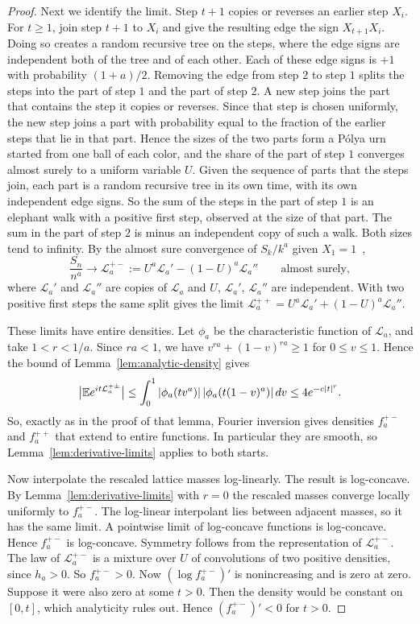 \begin{proof}
Next we identify the limit. Step $t+1$ copies or reverses an earlier
step $X_i$. For $t\ge1$, join step $t+1$ to $X_i$ and give the
resulting edge the sign $X_{t+1}X_i$. Doing so creates a random
recursive tree on the steps, where the edge signs are independent both
of the tree and of each other. Each of these edge signs is $+1$ with
probability $(1+a)/2$. Removing the edge from step $2$ to step $1$
splits the steps into the part of step $1$ and the part of step $2$. A
new step joins the part that contains the step it copies or reverses.
Since that step is chosen uniformly, the new step joins a part with
probability equal to the fraction of the earlier steps that lie in
that part. Hence the sizes of the two
parts form a P\'olya urn started from one ball of each color, and the
share of the part of step $1$ converges almost surely to a uniform
variable $U$. Given the sequence of parts that the steps join, each
part is a random recursive tree in its own time, with its own
independent edge signs. So the sum of the steps in the part of step
$1$ is an elephant walk with a positive first step, observed at the
size of that part. The sum in the part of step $2$ is minus an
independent copy of such a walk. Both sizes tend to infinity. By the
almost sure convergence of $S_k/k^a$ given $X_1=1$~\cite[Theorem~3.7]{bercu2018},
\[
 \frac{S_n}{n^a}\longrightarrow
 \mathcal L_a^{+-}:=U^a\mathcal L_a'-(1-U)^a\mathcal L_a''
 \qquad\text{almost surely},
\]
where $\mathcal L_a'$ and $\mathcal L_a''$ are copies of $\mathcal L_a$
and $U$, $\mathcal L_a'$, $\mathcal L_a''$ are independent. With two
positive first steps the same split gives the limit
$\mathcal L_a^{++}=U^a\mathcal L_a'+(1-U)^a\mathcal L_a''$.

These limits have entire densities. Let $\phi_a$ be the characteristic
function of $\mathcal L_a$, and take $1<r<1/a$. Since $ra<1$, we have
$v^{ra}+(1-v)^{ra}\ge1$ for $0\le v\le1$. Hence the bound of
Lemma~\ref{lem:analytic-density} gives
\[
 \bigl|\mathbb{E} e^{it\mathcal L_a^{+\pm}}\bigr|
 \le\int_0^1|\phi_a(tv^a)|\,|\phi_a(t(1-v)^a)|\,dv
 \le4e^{-c|t|^r}.
\]
So, exactly as in the proof of that lemma, Fourier inversion gives
densities $f_a^{+-}$ and $f_a^{++}$ that extend to entire functions.
In particular they are smooth, so Lemma~\ref{lem:derivative-limits}
applies to both starts.

Now interpolate the rescaled lattice masses log-linearly. The result
is log-concave. By Lemma~\ref{lem:derivative-limits} with $r=0$ the
rescaled masses converge locally uniformly to $f_a^{+-}$. The
log-linear interpolant lies between adjacent masses, so it has the
same limit. A pointwise limit of log-concave functions is log-concave.
Hence $f_a^{+-}$ is log-concave. Symmetry follows from the
representation of $\mathcal L_a^{+-}$. The law of $\mathcal L_a^{+-}$
is a mixture over $U$ of convolutions of two positive densities, since
$h_a>0$. So $f_a^{+-}>0$. Now $(\log f_a^{+-})'$ is nonincreasing and is zero at zero.
Suppose it were also zero at some $t>0$. Then the density would be
constant on $[0,t]$, which analyticity rules out. Hence
$(f_a^{+-})'<0$ for $t>0$.


\end{proof}
